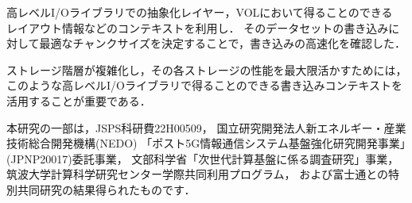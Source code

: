 \documentclass[submit,techrep,noauthor]{ipsj}
\begin{document}
高レベルI/Oライブラリでの抽象化レイヤー，VOLにおいて得ることのできる
レイアウト情報などのコンテキストを利用し．
そのデータセットの書き込みに対して最適なチャンクサイズを決定することで，書き込みの高速化を確認した．

ストレージ階層が複雑化し，その各ストレージの性能を最大限活かすためには，
このような高レベルI/Oライブラリで得ることのできる書き込みコンテキストを活用することが重要である．


\begin{acknowledgment}
	本研究の一部は，JSPS科研費22H00509，
	国立研究開発法人新エネルギー・産業技術総合開発機構(NEDO)
	「ポスト5G情報通信システム基盤強化研究開発事業」(JPNP20017)委託事業，
	文部科学省「次世代計算基盤に係る調査研究」事業，
	筑波大学計算科学研究センター学際共同利用プログラム，
	および富士通との特別共同研究の結果得られたものです．
\end{acknowledgment}



\end{document}
